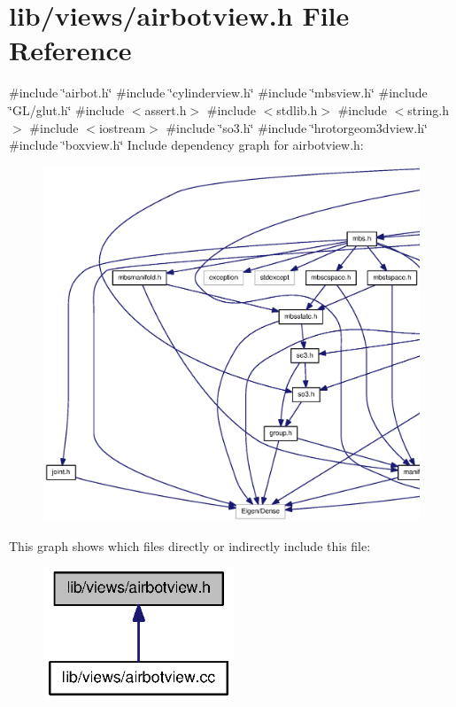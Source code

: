 \section{lib/views/airbotview.h \-File \-Reference}
\label{airbotview_8h}
{\ttfamily \#include \char`\"{}airbot.\-h\char`\"{}}\*
{\ttfamily \#include \char`\"{}cylinderview.\-h\char`\"{}}\*
{\ttfamily \#include \char`\"{}mbsview.\-h\char`\"{}}\*
{\ttfamily \#include \char`\"{}\-G\-L/glut.\-h\char`\"{}}\*
{\ttfamily \#include $<$assert.\-h$>$}\*
{\ttfamily \#include $<$stdlib.\-h$>$}\*
{\ttfamily \#include $<$string.\-h$>$}\*
{\ttfamily \#include $<$iostream$>$}\*
{\ttfamily \#include \char`\"{}so3.\-h\char`\"{}}\*
{\ttfamily \#include \char`\"{}hrotorgeom3dview.\-h\char`\"{}}\*
{\ttfamily \#include \char`\"{}boxview.\-h\char`\"{}}\*
\-Include dependency graph for airbotview.\-h\-:\nopagebreak
\begin{figure}[H]
\begin{center}
\leavevmode
\includegraphics[width=350pt]{airbotview_8h__incl}
\end{center}
\end{figure}
\-This graph shows which files directly or indirectly include this file\-:\nopagebreak
\begin{figure}[H]
\begin{center}
\leavevmode
\includegraphics[width=160pt]{airbotview_8h__dep__incl}
\end{center}
\end{figure}
